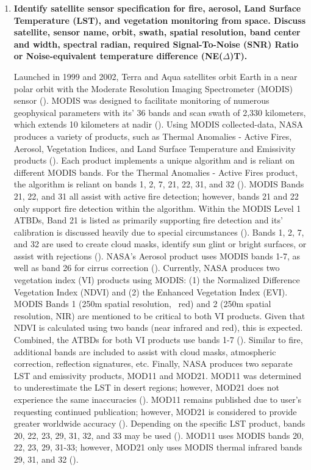 \documentclass[12pt, letterpaper]{article}
\begin{document}
\begin{enumerate}
    \pagebreak
    \item \textbf{Identify satellite sensor specification for fire, aerosol, Land Surface Temperature (LST), and vegetation monitoring from space. Discuss satellite, sensor name, orbit, swath, spatial resolution, band center and width, spectral radian, required Signal-To-Noise (SNR) Ratio or Noise-equivalent temperature difference (NE($\Delta$)T).}

    \bigskip
    Launched in 1999 and 2002, Terra and Aqua satellites orbit Earth in a near polar orbit with the Moderate Resolution Imaging Spectrometer (MODIS) sensor (\cite{qubook}). MODIS was designed to facilitate monitoring of numerous geophysical parameters with its' 36 bands and scan swath of 2,330 kilometers, which extends 10 kilometers at nadir (\cite{qubook}). Using MODIS collected-data, NASA produces a variety of products, such as Thermal Anomalies - Active Fires, Aerosol, Vegetation Indices, and Land Surface Temperature and Emissivity products (\cite{modwebsite}). Each product implements a unique algorithm and is reliant on different MODIS bands. For the Thermal Anomalies - Active Fires product, the algorithm is reliant on bands 1, 2, 7, 21, 22, 31, and 32 (\cite{modisfireatbd}). MODIS Bands 21, 22, and 31 all assist with active fire detection; however, bands 21 and 22 only support fire detection within the algorithm. Within the MODIS Level 1 ATBDs, Band 21 is listed as primarily supporting fire detection and its' calibration is discussed heavily due to special circumstances (\cite{modis1batbd}). Bands 1, 2, 7, and 32 are used to create cloud masks, identify sun glint or bright surfaces, or assist with rejections (\cite{modisfireatbd}). NASA's Aerosol product uses MODIS bands 1-7, as well as band 26 for cirrus correction (\cite{aerosolatbd}). Currently, NASA produces two vegetation index (VI) products using MODIS: (1) the Normalized Difference Vegetation Index (NDVI) and (2) the Enhanced Vegetation Index (EVI). MODIS Bands 1 (250m spatial resolution, ~red) and 2 (250m spatial resolution, NIR) are mentioned to be critical to both VI products. Given that NDVI is calculated using two bands (near infrared and red), this is expected. Combined, the ATBDs for both VI products use bands 1-7 (\cite{modis_veg}). Similar to fire, additional bands are included to assist with cloud masks, atmospheric correction, reflection signatures, etc. Finally, NASA produces two separate LST and emissivity products, MOD11 and MOD21. MOD11 was determined to underestimate the LST in desert regions; however, MOD21 does not experience the same inaccuracies (\cite{mod11_web}). MOD11 remains published due to user's requesting continued publication; however, MOD21 is considered to provide greater worldwide accuracy (\cite{mod11_web}). Depending on the specific LST product, bands 20, 22, 23, 29,  31, 32, and 33 may be used (\cite{modis_lst21}). MOD11 uses MODIS bands 20, 22, 23, 29, 31-33; however, MOD21 only uses MODIS thermal infrared bands 29, 31, and 32 (\cite{modis_lst21}).


\end{enumerate}
\end{document}
